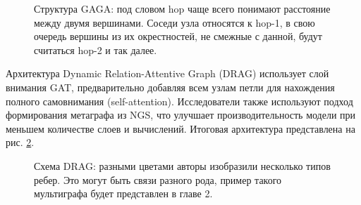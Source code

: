 \begin{figure}[ht]
\begin{center}
\caption{\label{wang2023_arch} Структура GAGA: под словом hop чаще всего понимают расстояние между двумя вершинами. Соседи узла относятся к hop-1, в свою очередь вершины из их окрестностей, не смежные с данной, будут считаться hop-2 и так далее.}
\end {center}
\end {figure}

Архитектура Dynamic Relation-Attentive Graph (DRAG) \cite{kim2023} использует слой внимания GAT, предварительно добавляя всем узлам петли для нахождения полного самовнимания (self-attention). Исследователи также используют подход формирования метаграфа из NGS, что улучшает производительность модели при меньшем количестве слоев и вычислений. Итоговая архитектура представлена на рис. \ref{kim2023_arch}.

\begin{figure}[ht]
\begin{center}
\caption{\label{kim2023_arch} Схема DRAG: разными цветами авторы изобразили несколько типов ребер. Это могут быть связи разного рода, пример такого мультиграфа будет представлен в главе 2.}
\end {center}
\end {figure}

